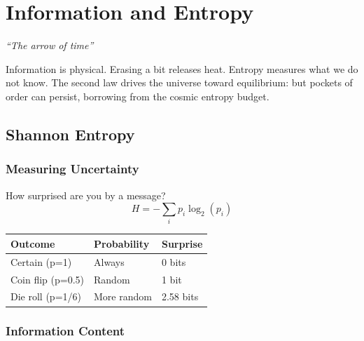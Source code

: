 \documentclass[
  11pt,
  letterpaper,
  twoside,
  openright]{book}
\begin{document}
\chapter{Information and Entropy}\label{sec-information-entropy}

\emph{``The arrow of time''}

\begin{tcolorbox}[enhanced jigsaw, coltitle=black, colbacktitle=quarto-callout-note-color!10!white, toprule=.15mm, colframe=quarto-callout-note-color-frame, arc=.35mm, opacityback=0, bottomtitle=1mm, toptitle=1mm, breakable, colback=white, titlerule=0mm, opacitybacktitle=0.6, title=\textcolor{quarto-callout-note-color}{\faInfo}\hspace{0.5em}{Key Revelation}, rightrule=.15mm, bottomrule=.15mm, leftrule=.75mm, left=2mm]

Information is physical. Erasing a bit releases heat. Entropy measures
what we do not know. The second law drives the universe toward
equilibrium: but pockets of order can persist, borrowing from the cosmic
entropy budget.

\end{tcolorbox}

\section{Shannon Entropy}\label{shannon-entropy}

\subsection{Measuring Uncertainty}\label{measuring-uncertainty}

How surprised are you by a message? \[
H = -\sum_i p_i \log_2(p_i)
\]

\begin{longtable}[]{@{}lll@{}}
\toprule\noalign{}
Outcome & Probability & Surprise \\
\midrule\noalign{}
\endhead
\bottomrule\noalign{}
\endlastfoot
Certain (p=1) & Always & 0 bits \\
Coin flip (p=0.5) & Random & 1 bit \\
Die roll (p=1/6) & More random & 2.58 bits \\
\end{longtable}

\subsection{Information Content}\label{information-content-1}
\end{document}

